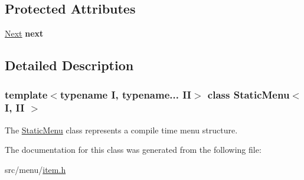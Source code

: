 \subsection*{Protected Attributes}
\begin{DoxyCompactItemize}
\item 
\mbox{\label{classStaticMenu_aee7481e4086bdd909f05eb80177ade99}} 
\hyperlink{classStaticMenu}{Next} {\bfseries next}
\end{DoxyCompactItemize}


\subsection{Detailed Description}
\subsubsection*{template$<$typename I, typename... II$>$\newline
class Static\+Menu$<$ I, I\+I $>$}

The \hyperlink{classStaticMenu}{Static\+Menu} class represents a compile time menu structure. 

The documentation for this class was generated from the following file\+:\begin{DoxyCompactItemize}
\item 
src/menu/\hyperlink{item_8h}{item.\+h}\end{DoxyCompactItemize}
